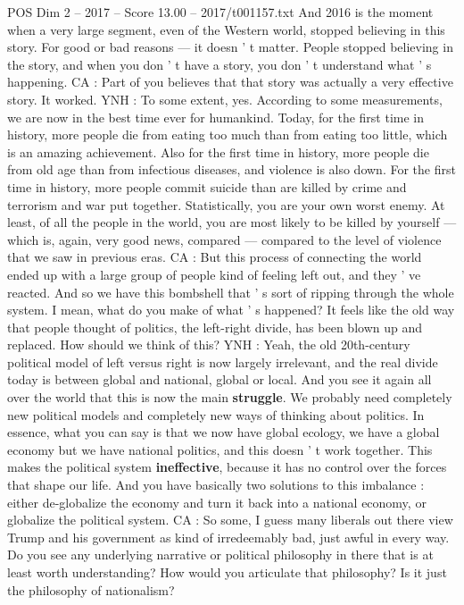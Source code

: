\begin{textsample}{POS Dim 2 – 2017 – Score 13.00 – 2017/t001157.txt}
And 2016 is the moment when a very large segment, even of the Western world, stopped believing in this story.
For good or bad reasons — it doesn ' t matter.
People stopped believing in the story, and when you don ' t have a story, you don ' t understand what ' s happening.
CA : Part of you believes that that story was actually a very effective story.
It worked.
YNH : To some extent, yes.
According to some measurements, we are now in the best time ever for humankind.
Today, for the first time in history, more people die from eating too much than from eating too little, which is an amazing achievement.
Also for the first time in history, more people die from old age than from infectious diseases, and violence is also down.
For the first time in history, more people commit suicide than are killed by crime and terrorism and war put together.
Statistically, you are your own worst enemy.
At least, of all the people in the world, you are most likely to be killed by yourself — which is, again, very good news, compared — compared to the level of violence that we saw in previous eras.
CA : But this process of connecting the world ended up with a large group of people kind of feeling left out, and they ' ve reacted.
And so we have this bombshell that ' s sort of ripping through the whole system.
I mean, what do you make of what ' s happened?
It feels like the old way that people thought of politics, the left-right divide, has been blown up and replaced.
How should we think of this?
YNH : Yeah, the old 20th-century political model of left versus right is now largely irrelevant, and the real divide today is between global and national, global or local.
And you see it again all over the world that this is now the main \textbf{struggle}.
We probably need completely new political models and completely new ways of thinking about politics.
In essence, what you can say is that we now have global ecology, we have a global economy but we have national politics, and this doesn ' t work together.
This makes the political system \textbf{ineffective}, because it has no control over the forces that shape our life.
And you have basically two solutions to this imbalance : either de-globalize the economy and turn it back into a national economy, or globalize the political system.
CA : So some, I guess many liberals out there view Trump and his government as kind of irredeemably bad, just awful in every way.
Do you see any underlying narrative or political philosophy in there that is at least worth understanding?
How would you articulate that philosophy?
Is it just the philosophy of nationalism?

\end{textsample}
